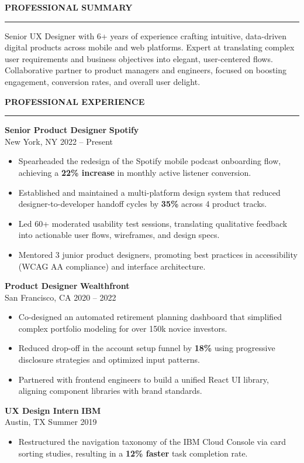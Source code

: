 \documentclass[10pt,letterpaper]{article}
\newcommand{\cvsection}[1]{%
  \vspace{3.5mm}%
  \noindent
  {\large\bfseries\color{accent}\MakeUppercase{#1}}\\[-1.5ex]%
  {\color{accent!30}\rule{\linewidth}{1.5pt}}%
  \vspace{2mm}%
}
\newcommand{\experienceitem}[4]{%
  \vspace{2.5mm}%
  \noindent
  \begin{minipage}{\linewidth}
    {\textbf{#1} \hfill \small\color{accent}\textbf{#2}} \\
    {\small\color{darkneutral}#3 \hfill \small\color{muted}#4}
  \end{minipage}%
  \vspace{1.5mm}%
}
\begin{document}
\begin{minipage}[t]{0.64\textwidth}
  \vspace{0pt}

  \cvsection{Professional Summary}
  \small
  Senior UX Designer with 6+ years of experience crafting intuitive, data-driven digital products across mobile and web platforms. Expert at translating complex user requirements and business objectives into elegant, user-centered flows. Collaborative partner to product managers and engineers, focused on boosting engagement, conversion rates, and overall user delight.

  \cvsection{Professional Experience}
  
  \experienceitem{Senior Product Designer}{Spotify}{New York, NY}{2022 -- Present}
  \begin{itemize}[leftmargin=3.5mm, nosep, itemsep=2.5pt]
    \item Spearheaded the redesign of the Spotify mobile podcast onboarding flow, achieving a \textbf{22\% increase} in monthly active listener conversion.
    \item Established and maintained a multi-platform design system that reduced designer-to-developer handoff cycles by \textbf{35\%} across 4 product tracks.
    \item Led 60+ moderated usability test sessions, translating qualitative feedback into actionable user flows, wireframes, and design specs.
    \item Mentored 3 junior product designers, promoting best practices in accessibility (WCAG AA compliance) and interface architecture.
  \end{itemize}

  \experienceitem{Product Designer}{Wealthfront}{San Francisco, CA}{2020 -- 2022}
  \begin{itemize}[leftmargin=3.5mm, nosep, itemsep=2.5pt]
    \item Co-designed an automated retirement planning dashboard that simplified complex portfolio modeling for over 150k novice investors.
    \item Reduced drop-off in the account setup funnel by \textbf{18\%} using progressive disclosure strategies and optimized input patterns.
    \item Partnered with frontend engineers to build a unified React UI library, aligning component libraries with brand standards.
  \end{itemize}

  \experienceitem{UX Design Intern}{IBM}{Austin, TX}{Summer 2019}
  \begin{itemize}[leftmargin=3.5mm, nosep, itemsep=2.5pt]
    \item Restructured the navigation taxonomy of the IBM Cloud Console via card sorting studies, resulting in a \textbf{12\% faster} task completion rate.
  \end{itemize}


\end{minipage}
\end{document}
